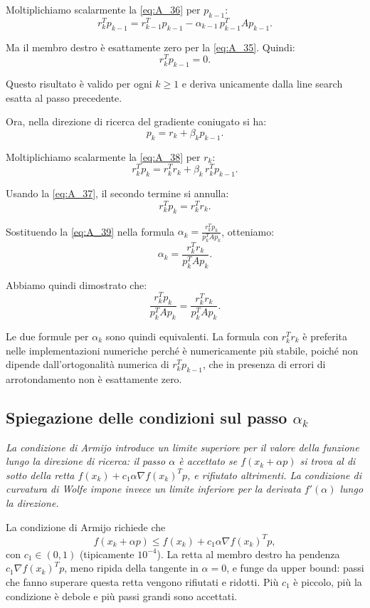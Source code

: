 \documentclass[a4paper,12pt]{article}
\numberwithin{equation}{section}
\numberwithin{figure}{section}
\numberwithin{table}{section}
\begin{document}
Moltiplichiamo scalarmente la \eqref{eq:A_36} per $p_{k-1}$:
\[
r_k^T p_{k-1} = r_{k-1}^T p_{k-1} - \alpha_{k-1} \, p_{k-1}^T A p_{k-1}.
\]

Ma il membro destro è esattamente zero per la \eqref{eq:A_35}. Quindi:
\[
r_k^T p_{k-1} = 0. \tag{A.37}\label{eq:A_37}
\]

Questo risultato è valido per ogni $k \ge 1$ e deriva unicamente dalla line search esatta al passo precedente.

Ora, nella direzione di ricerca del gradiente coniugato si ha:
\[
p_k = r_k + \beta_k p_{k-1}. \tag{A.38}\label{eq:A_38}
\]

Moltiplichiamo scalarmente la \eqref{eq:A_38} per $r_k$:
\[
r_k^T p_k = r_k^T r_k + \beta_k \, r_k^T p_{k-1}.
\]

Usando la \eqref{eq:A_37}, il secondo termine si annulla:
\[
r_k^T p_k = r_k^T r_k. \tag{A.39}\label{eq:A_39}
\]

Sostituendo la \eqref{eq:A_39} nella formula $\alpha_k = \frac{r_k^T p_k}{p_k^T A p_k}$, otteniamo:
\[
\alpha_k = \frac{r_k^T r_k}{p_k^T A p_k}. \tag{A.40}\label{eq:A_40}
\]

Abbiamo quindi dimostrato che:
\[
\frac{r_k^T p_k}{p_k^T A p_k} = \frac{r_k^T r_k}{p_k^T A p_k}.
\]

Le due formule per $\alpha_k$ sono quindi equivalenti. La formula con $r_k^T r_k$ è preferita nelle implementazioni numeriche perché è numericamente più stabile, poiché non dipende dall'ortogonalità numerica di $r_k^T p_{k-1}$, che in presenza di errori di arrotondamento non è esattamente zero.
\newpage
\subsection{Spiegazione delle condizioni sul passo $\alpha_k$}\label{app:wolfe}
\textit{
La condizione di Armijo introduce un limite superiore per il valore della funzione lungo la direzione di ricerca: il passo $\alpha$ è accettato se $f(x_k+\alpha p)$ si trova al di sotto della retta $f(x_k)+c_1\alpha\nabla f(x_k)^Tp$, e rifiutato altrimenti. La condizione di curvatura di Wolfe impone invece un limite inferiore per la derivata $f'(\alpha)$ lungo la direzione.
}

La condizione di Armijo richiede che
\[
f(x_k+\alpha p) \le f(x_k) + c_1 \alpha \nabla f(x_k)^T p,
\]
con $c_1 \in (0,1)$ (tipicamente $10^{-4}$). La retta al membro destro ha pendenza $c_1\nabla f(x_k)^Tp$, meno ripida della tangente in $\alpha=0$, e funge da upper bound: passi che fanno superare questa retta vengono rifiutati e ridotti. Più $c_1$ è piccolo, più la condizione è debole e più passi grandi sono accettati.
\end{document}
